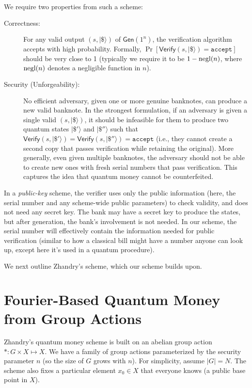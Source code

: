 \documentclass[12pt]{report}
\begin{document}
We require two properties from such a scheme:
\begin{description}
    \item[Correctness:] For any valid output $(s, |\$\rangle)$ of $\mathsf{Gen}(1^n)$, the verification algorithm accepts with high probability. Formally, $\Pr[\mathsf{Verify}(s, |\$\rangle) = \mathtt{accept}]$ should be very close to 1 (typically we require it to be $1 - \operatorname{negl}(n)$, where $\operatorname{negl}(n)$ denotes a negligible function in $n$).
    \item[Security (Unforgeability):] No efficient adversary, given one or more genuine banknotes, can produce a new valid banknote. In the strongest formulation, if an adversary is given a single valid $(s, |\$\rangle)$, it should be infeasible for them to produce two quantum states $|\$'\rangle$ and $|\$''\rangle$ such that $\mathsf{Verify}(s, |\$'\rangle) = \mathsf{Verify}(s, |\$''\rangle) = \mathtt{accept}$ (i.e., they cannot create a second copy that passes verification while retaining the original). More generally, even given multiple banknotes, the adversary should not be able to create new ones with fresh serial numbers that pass verification. This captures the idea that quantum money cannot be counterfeited.
\end{description}

In a \emph{public-key} scheme, the verifier uses only the public information (here, the serial number and any scheme-wide public parameters) to check validity, and does not need any secret key. The bank may have a secret key to produce the states, but after generation, the bank’s involvement is not needed. In our scheme, the serial number will effectively contain the information needed for public verification (similar to how a classical bill might have a number anyone can look up, except here it’s used in a quantum procedure).

We next outline Zhandry’s scheme, which our scheme builds upon.

\section{Fourier-Based Quantum Money from Group Actions}
Zhandry’s quantum money scheme \cite{Zhandry2024} is built on an abelian group action $*:G \times X \mapsto X$. We have a family of group actions parameterized by the security parameter $n$ (so the size of $G$ grows with $n$). For simplicity, assume $|G| = N$. The scheme also fixes a particular element $x_0 \in X$ that everyone knows (a public base point in $X$).
\end{document}
